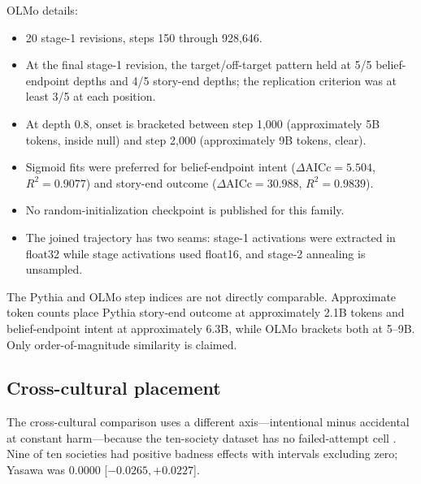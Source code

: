 OLMo details:
\begin{itemize}[leftmargin=*]
    \item 20 stage-1 revisions, steps 150 through 928{,}646.
    \item At the final stage-1 revision, the target/off-target pattern held at 5/5 belief-endpoint depths and 4/5 story-end depths; the replication criterion was at least 3/5 at each position.
    \item At depth 0.8, onset is bracketed between step 1{,}000 (approximately 5B tokens, inside null) and step 2{,}000 (approximately 9B tokens, clear).
    \item Sigmoid fits were preferred for belief-endpoint intent ($\Delta\mathrm{AICc}=5.504$, $R^2=0.9077$) and story-end outcome ($\Delta\mathrm{AICc}=30.988$, $R^2=0.9839$).
    \item No random-initialization checkpoint is published for this family.
    \item The joined trajectory has two seams: stage-1 activations were extracted in float32 while stage activations used float16, and stage-2 annealing is unsampled.
\end{itemize}

The Pythia and OLMo step indices are not directly comparable.
Approximate token counts place Pythia story-end outcome at approximately 2.1B tokens and belief-endpoint intent at approximately 6.3B, while OLMo brackets both at 5--9B.
Only order-of-magnitude similarity is claimed.

\subsection{Cross-cultural placement}
\label{sec:supp-crosscultural}

The cross-cultural comparison uses a different axis---intentional minus accidental at constant harm---because the ten-society dataset has no failed-attempt cell \citep{barrett2016societies,curtin2020kinship}.
Nine of ten societies had positive badness effects with intervals excluding zero; Yasawa was $0.0000$ [${-0.0265},+0.0227$].


